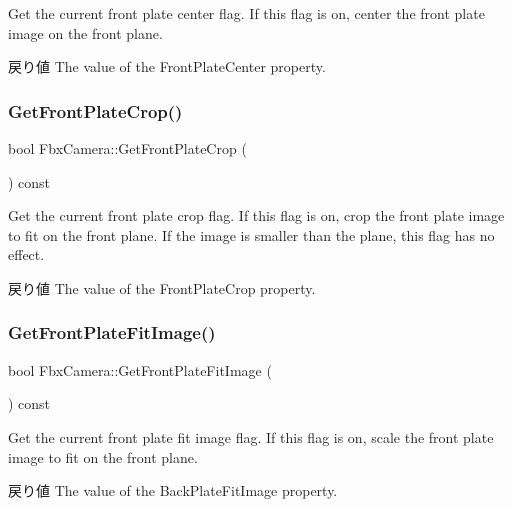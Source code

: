 Get the current front plate center flag. If this flag is on, center the front plate image on the front plane. \begin{DoxyReturn}{戻り値}
The value of the Front\+Plate\+Center property. 
\end{DoxyReturn}
\mbox{\label{class_fbx_camera_a3b5f0677c20c4e648342949b7bf5798f}} 
\subsubsection{\texorpdfstring{Get\+Front\+Plate\+Crop()}{GetFrontPlateCrop()}}
{\footnotesize\ttfamily bool Fbx\+Camera\+::\+Get\+Front\+Plate\+Crop (\begin{DoxyParamCaption}{ }\end{DoxyParamCaption}) const}

Get the current front plate crop flag. If this flag is on, crop the front plate image to fit on the front plane. If the image is smaller than the plane, this flag has no effect. \begin{DoxyReturn}{戻り値}
The value of the Front\+Plate\+Crop property. 
\end{DoxyReturn}
\mbox{\label{class_fbx_camera_a212030735f4c855c485659b5551b3d7f}} 
\subsubsection{\texorpdfstring{Get\+Front\+Plate\+Fit\+Image()}{GetFrontPlateFitImage()}}
{\footnotesize\ttfamily bool Fbx\+Camera\+::\+Get\+Front\+Plate\+Fit\+Image (\begin{DoxyParamCaption}{ }\end{DoxyParamCaption}) const}

Get the current front plate fit image flag. If this flag is on, scale the front plate image to fit on the front plane. \begin{DoxyReturn}{戻り値}
The value of the Back\+Plate\+Fit\+Image property. 
\end{DoxyReturn}
\mbox{\label{class_fbx_camera_a35528b16d2cb6bfbc56883d08957003d}} 
